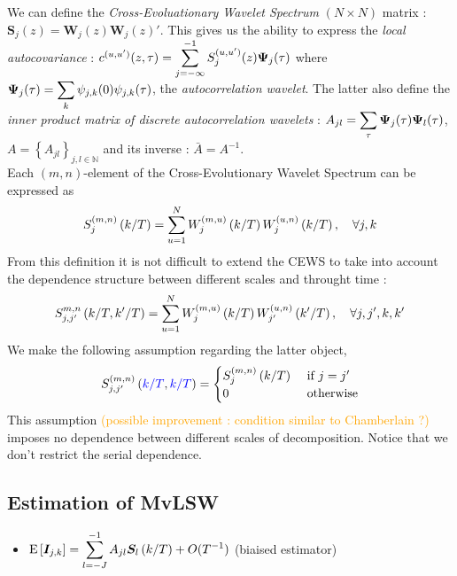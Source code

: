 \documentclass[main_document.tex]{subfiles}
\begin{document}
We can define the \emph{Cross-Evoluationary Wavelet Spectrum} $(N \times N)$ matrix : $\bm{S}_{j}(z) = \bm{W}_{j}(z)\bm{W}_{j}(z)'$.
This gives us the ability to express the \emph{local autocovariance} : $c^{(u,u')}(z,\tau) = \sum_{j=-\infty}^{-1} S_{j}^{(u,u')}(z) \ACwavelet{j}{\tau}$ where $\ACwavelet{j}{\tau} = \sum_{k} \wavelet{j}{k}{0}\wavelet{j}{k}{\tau}$, the \emph{autocorrelation wavelet}. The latter also define the \emph{inner product matrix of discrete autocorrelation wavelets} : $A_{jl} = \sum_{\tau}\ACwavelet{j}{\tau}\ACwavelet{l}{\tau}$, $A = \left\{ A_{jl}\right\}_{j,l \in \mathbb{N}}$ and its inverse : $\bar{A} = A^{-1}$.\\

Each $(m,n)$-element of the Cross-Evolutionary Wavelet Spectrum can be expressed as 
\begin{align*}
	\eCEWS{m}{n}{j}{k} = \sum_{u=1}^{N} \eW{m}{u}{j}{k}\eW{u}{n}{j}{k}, \quad \forall j,k
\end{align*}
From this definition it is not difficult to extend the CEWS to take into account the dependence structure between different scales and throught time : 
\begin{align}\label{eq:serial-scale-CEWS}
	S_{j,j'}^{m,n}\left( k/T, k'/T \right) = \sum_{u=1}^{N} \eW{m}{u}{j}{k}\eW{u}{n}{j'}{k'}, \quad \forall j,j',k,k'
\end{align}
We make the following assumption regarding the latter object, 
\begin{align}\label{eq:scale-indep-spectrum}
S_{j,j'}^{(m,n)}\left( \textcolor{blue}{k/T}, \textcolor{blue}{k/T} \right) = 
	\begin{cases}
		\eCEWS{m}{n}{j}{k} & \text{ if } j=j' \\
		0 & \text{ otherwise}
	\end{cases}
\end{align}
This assumption \textcolor{orange}{(possible improvement : condition similar to Chamberlain ?)}  imposes no dependence between different scales of decomposition. Notice that we don't restrict the serial dependence. 

\subsection{Estimation of MvLSW}
		\begin{itemize}
			\item $\E{\rawPeriodo{j}{k}} = \sum_{l=-J}^{-1} A_{jl}\CEWS{l}{k} + O(T^{-1})$ \hspace{2cm} (biaised estimator)
		\end{itemize}
\end{document}
